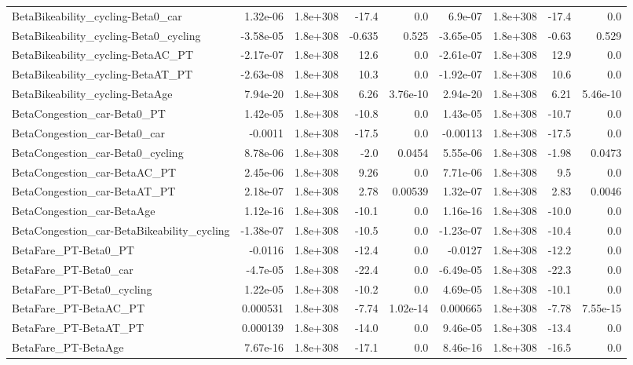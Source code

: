 \begin{tabular}{lrrrrrrrr}
BetaBikeability_cycling-Beta0_car & 1.32e-06 & 1.8e+308 & -17.4 & 0.0 & 6.9e-07 & 1.8e+308 & -17.4 & 0.0 \\
BetaBikeability_cycling-Beta0_cycling & -3.58e-05 & 1.8e+308 & -0.635 & 0.525 & -3.65e-05 & 1.8e+308 & -0.63 & 0.529 \\
BetaBikeability_cycling-BetaAC_PT & -2.17e-07 & 1.8e+308 & 12.6 & 0.0 & -2.61e-07 & 1.8e+308 & 12.9 & 0.0 \\
BetaBikeability_cycling-BetaAT_PT & -2.63e-08 & 1.8e+308 & 10.3 & 0.0 & -1.92e-07 & 1.8e+308 & 10.6 & 0.0 \\
BetaBikeability_cycling-BetaAge & 7.94e-20 & 1.8e+308 & 6.26 & 3.76e-10 & 2.94e-20 & 1.8e+308 & 6.21 & 5.46e-10 \\
BetaCongestion_car-Beta0_PT & 1.42e-05 & 1.8e+308 & -10.8 & 0.0 & 1.43e-05 & 1.8e+308 & -10.7 & 0.0 \\
BetaCongestion_car-Beta0_car & -0.0011 & 1.8e+308 & -17.5 & 0.0 & -0.00113 & 1.8e+308 & -17.5 & 0.0 \\
BetaCongestion_car-Beta0_cycling & 8.78e-06 & 1.8e+308 & -2.0 & 0.0454 & 5.55e-06 & 1.8e+308 & -1.98 & 0.0473 \\
BetaCongestion_car-BetaAC_PT & 2.45e-06 & 1.8e+308 & 9.26 & 0.0 & 7.71e-06 & 1.8e+308 & 9.5 & 0.0 \\
BetaCongestion_car-BetaAT_PT & 2.18e-07 & 1.8e+308 & 2.78 & 0.00539 & 1.32e-07 & 1.8e+308 & 2.83 & 0.0046 \\
BetaCongestion_car-BetaAge & 1.12e-16 & 1.8e+308 & -10.1 & 0.0 & 1.16e-16 & 1.8e+308 & -10.0 & 0.0 \\
BetaCongestion_car-BetaBikeability_cycling & -1.38e-07 & 1.8e+308 & -10.5 & 0.0 & -1.23e-07 & 1.8e+308 & -10.4 & 0.0 \\
BetaFare_PT-Beta0_PT & -0.0116 & 1.8e+308 & -12.4 & 0.0 & -0.0127 & 1.8e+308 & -12.2 & 0.0 \\
BetaFare_PT-Beta0_car & -4.7e-05 & 1.8e+308 & -22.4 & 0.0 & -6.49e-05 & 1.8e+308 & -22.3 & 0.0 \\
BetaFare_PT-Beta0_cycling & 1.22e-05 & 1.8e+308 & -10.2 & 0.0 & 4.69e-05 & 1.8e+308 & -10.1 & 0.0 \\
BetaFare_PT-BetaAC_PT & 0.000531 & 1.8e+308 & -7.74 & 1.02e-14 & 0.000665 & 1.8e+308 & -7.78 & 7.55e-15 \\
BetaFare_PT-BetaAT_PT & 0.000139 & 1.8e+308 & -14.0 & 0.0 & 9.46e-05 & 1.8e+308 & -13.4 & 0.0 \\
BetaFare_PT-BetaAge & 7.67e-16 & 1.8e+308 & -17.1 & 0.0 & 8.46e-16 & 1.8e+308 & -16.5 & 0.0 \\

\end{tabular}
